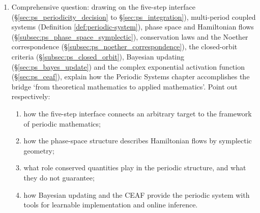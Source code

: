 \begin{enumerate}[leftmargin=3em, label=\textbf{Exercise \arabic*}]
    \item Comprehensive question: drawing on the five-step interface (\S\ref{sec:ps_periodicity_decision} to \S\ref{sec:ps_integration}),
    multi-period coupled systems (Definition \ref{def:periodic-system}),
    phase space and Hamiltonian flows (\S\ref{subsec:ps_phase_space_symplectic}),
    conservation laws and the Noether correspondence (\S\ref{subsec:ps_noether_correspondence}),
    the closed-orbit criteria (\S\ref{subsec:ps_closed_orbit}),
    Bayesian updating (\S\ref{sec:ps_bayes_update})
    and the complex exponential activation function (\S\ref{sec:ps_ceaf}),
    explain how the Periodic Systems chapter accomplishes the bridge `from theoretical mathematics to applied mathematics'.
    Point out respectively:
    \begin{enumerate}[label=(\roman*)]
        \item how the five-step interface connects an arbitrary target to the framework of periodic mathematics;
        \item how the phase-space structure describes Hamiltonian flows by symplectic geometry;
        \item what role conserved quantities play in the periodic structure, and what they do not guarantee;
        \item how Bayesian updating and the CEAF provide the periodic system with tools for learnable implementation and online inference.
    \end{enumerate}
\end{enumerate}
